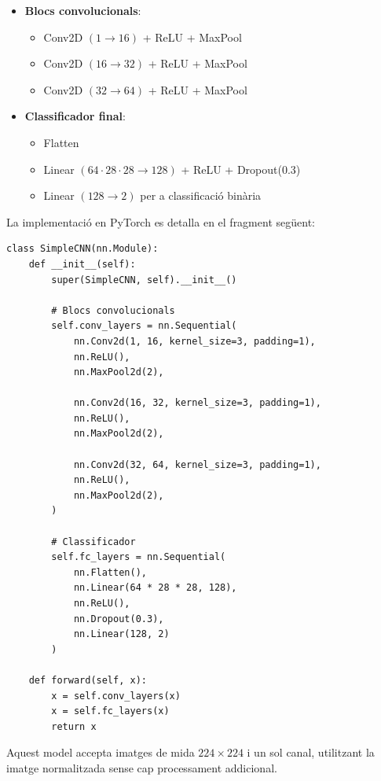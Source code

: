 \documentclass[12pt,a4paper]{article}
\begin{document}
\begin{itemize}
    \item \textbf{Blocs convolucionals}:
    \begin{itemize}
        \item Conv2D $(1 \rightarrow 16)$ + ReLU + MaxPool
        \item Conv2D $(16 \rightarrow 32)$ + ReLU + MaxPool
        \item Conv2D $(32 \rightarrow 64)$ + ReLU + MaxPool
    \end{itemize}

    \item \textbf{Classificador final}:
    \begin{itemize}
        \item Flatten
        \item Linear $(64 \cdot 28 \cdot 28 \rightarrow 128)$ + ReLU + Dropout(0.3)
        \item Linear $(128 \rightarrow 2)$ per a classificació binària
    \end{itemize}
\end{itemize}

La implementació en PyTorch es detalla en el fragment següent:

\begin{lstlisting}[style=mypython]
class SimpleCNN(nn.Module):
    def __init__(self):
        super(SimpleCNN, self).__init__()

        # Blocs convolucionals
        self.conv_layers = nn.Sequential(
            nn.Conv2d(1, 16, kernel_size=3, padding=1),
            nn.ReLU(),
            nn.MaxPool2d(2),

            nn.Conv2d(16, 32, kernel_size=3, padding=1),
            nn.ReLU(),
            nn.MaxPool2d(2),

            nn.Conv2d(32, 64, kernel_size=3, padding=1),
            nn.ReLU(),
            nn.MaxPool2d(2),
        )

        # Classificador
        self.fc_layers = nn.Sequential(
            nn.Flatten(),
            nn.Linear(64 * 28 * 28, 128),
            nn.ReLU(),
            nn.Dropout(0.3),
            nn.Linear(128, 2)
        )

    def forward(self, x):
        x = self.conv_layers(x)
        x = self.fc_layers(x)
        return x
\end{lstlisting}

Aquest model accepta imatges de mida $224 \times 224$ i un sol canal, utilitzant la
imatge normalitzada sense cap processament addicional.
\end{document}

